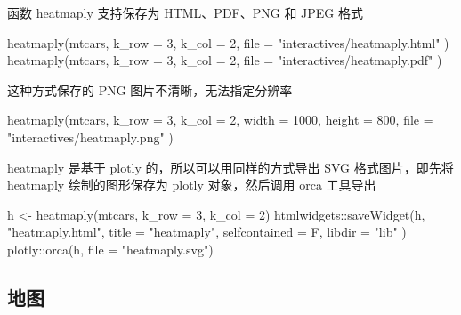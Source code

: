 \documentclass[
  b5paper,
  UTF8,twoside]{book}
\newenvironment{Shaded}{\begin{snugshade}}{\end{snugshade}}
\newcommand{\AttributeTok}[1]{\textcolor[rgb]{0.77,0.63,0.00}{#1}}
\newcommand{\DecValTok}[1]{\textcolor[rgb]{0.00,0.00,0.81}{#1}}
\newcommand{\FunctionTok}[1]{\textcolor[rgb]{0.00,0.00,0.00}{#1}}
\newcommand{\NormalTok}[1]{#1}
\newcommand{\OtherTok}[1]{\textcolor[rgb]{0.56,0.35,0.01}{#1}}
\newcommand{\SpecialCharTok}[1]{\textcolor[rgb]{0.00,0.00,0.00}{#1}}
\newcommand{\StringTok}[1]{\textcolor[rgb]{0.31,0.60,0.02}{#1}}
\begin{document}
函数 heatmaply 支持保存为 HTML、PDF、PNG 和 JPEG 格式

\begin{Shaded}
\begin{Highlighting}[]
\FunctionTok{heatmaply}\NormalTok{(mtcars,}
  \AttributeTok{k\_row =} \DecValTok{3}\NormalTok{, }\AttributeTok{k\_col =} \DecValTok{2}\NormalTok{,}
  \AttributeTok{file =} \StringTok{"interactives/heatmaply.html"}
\NormalTok{)}
\FunctionTok{heatmaply}\NormalTok{(mtcars,}
  \AttributeTok{k\_row =} \DecValTok{3}\NormalTok{, }\AttributeTok{k\_col =} \DecValTok{2}\NormalTok{,}
  \AttributeTok{file =} \StringTok{"interactives/heatmaply.pdf"}
\NormalTok{)}
\end{Highlighting}
\end{Shaded}

这种方式保存的 PNG 图片不清晰，无法指定分辨率

\begin{Shaded}
\begin{Highlighting}[]
\FunctionTok{heatmaply}\NormalTok{(mtcars,}
  \AttributeTok{k\_row =} \DecValTok{3}\NormalTok{, }\AttributeTok{k\_col =} \DecValTok{2}\NormalTok{,}
  \AttributeTok{width =} \DecValTok{1000}\NormalTok{, }\AttributeTok{height =} \DecValTok{800}\NormalTok{,}
  \AttributeTok{file =} \StringTok{"interactives/heatmaply.png"}
\NormalTok{)}
\end{Highlighting}
\end{Shaded}

heatmaply 是基于 plotly 的，所以可以用同样的方式导出 SVG 格式图片，即先将 heatmaply 绘制的图形保存为 plotly 对象，然后调用 orca 工具导出

\begin{Shaded}
\begin{Highlighting}[]
\NormalTok{h }\OtherTok{\textless{}{-}} \FunctionTok{heatmaply}\NormalTok{(mtcars, }\AttributeTok{k\_row =} \DecValTok{3}\NormalTok{, }\AttributeTok{k\_col =} \DecValTok{2}\NormalTok{)}
\NormalTok{htmlwidgets}\SpecialCharTok{::}\FunctionTok{saveWidget}\NormalTok{(h, }\StringTok{"heatmaply.html"}\NormalTok{,}
  \AttributeTok{title =} \StringTok{"heatmaply"}\NormalTok{,}
  \AttributeTok{selfcontained =}\NormalTok{ F, }\AttributeTok{libdir =} \StringTok{"lib"}
\NormalTok{)}
\NormalTok{plotly}\SpecialCharTok{::}\FunctionTok{orca}\NormalTok{(h, }\AttributeTok{file =} \StringTok{"heatmaply.svg"}\NormalTok{)}
\end{Highlighting}
\end{Shaded}

\hypertarget{subsec:plotly-map}{%
\subsection{地图}\label{subsec:plotly-map}}
\end{document}
